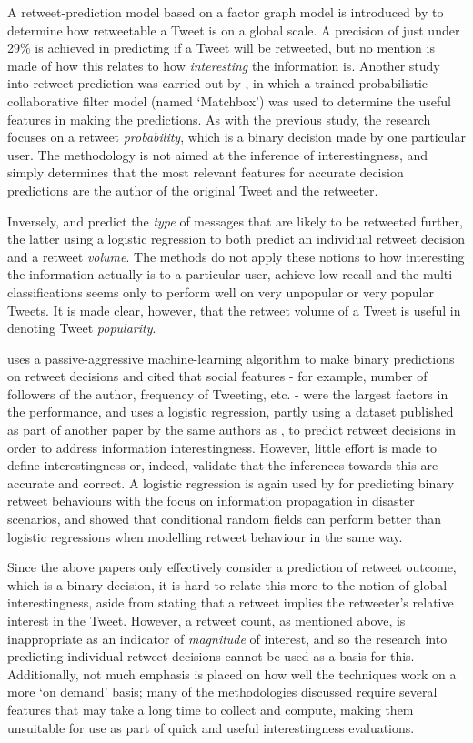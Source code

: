 A retweet-prediction model based on a factor graph model is introduced by \cite{yang10} to determine how retweetable a Tweet is on a global scale. A precision of just under 29\% is achieved in predicting if a Tweet will be retweeted, but no mention is made of how this relates to how \textit{interesting} the information is. Another study into retweet prediction was carried out by \cite{zaman10}, in which a trained probabilistic collaborative filter model (named `Matchbox') was used to determine the useful features in making the predictions. As with the previous study, the research focuses on a retweet \textit{probability}, which is a binary decision made by one particular user. The methodology is not aimed at the inference of interestingness, and simply determines that the most relevant features for accurate decision predictions are the author of the original Tweet and the retweeter.

Inversely, \cite{suh10} and \cite{hong11} predict the \textit{type} of messages that are likely to be retweeted further, the latter using a logistic regression to both predict an individual retweet decision and a retweet \textit{volume}. The methods do not apply these notions to how interesting the information actually is to a particular user, achieve low recall and the multi-classifications seems only to perform well on very unpopular or very popular Tweets. It is made clear, however, that the retweet volume of a Tweet is useful in denoting Tweet \textit{popularity}.

\cite{petrovic11} uses a passive-aggressive machine-learning algorithm to make binary predictions on retweet decisions and cited that social features - for example, number of followers of the author, frequency of Tweeting, etc. - were the largest factors in the performance, and \cite{naveed11} uses a logistic regression, partly using a dataset published as part of another paper by the same authors as \cite{petrovic11}, to predict retweet decisions in order to address information interestingness. However, little effort is made to define interestingness or, indeed, validate that the inferences towards this are accurate and correct. A logistic regression is again used by \cite{zhu11} for predicting binary retweet behaviours with the focus on information propagation in disaster scenarios, and \cite{peng11} showed that conditional random fields can perform better than logistic regressions when modelling retweet behaviour in the same way.

Since the above papers only effectively consider a prediction of retweet outcome, which is a binary decision, it is hard to relate this more to the notion of global interestingness, aside from stating that a retweet implies the retweeter's relative interest in the Tweet. However, a retweet count, as mentioned above, is inappropriate as an indicator of \textit{magnitude} of interest, and so the research into predicting individual retweet decisions cannot be used as a basis for this. Additionally, not much emphasis is placed on how well the techniques work on a more `on demand' basis; many of the methodologies discussed require several features that may take a long time to collect and compute, making them unsuitable for use as part of quick and useful interestingness evaluations.

